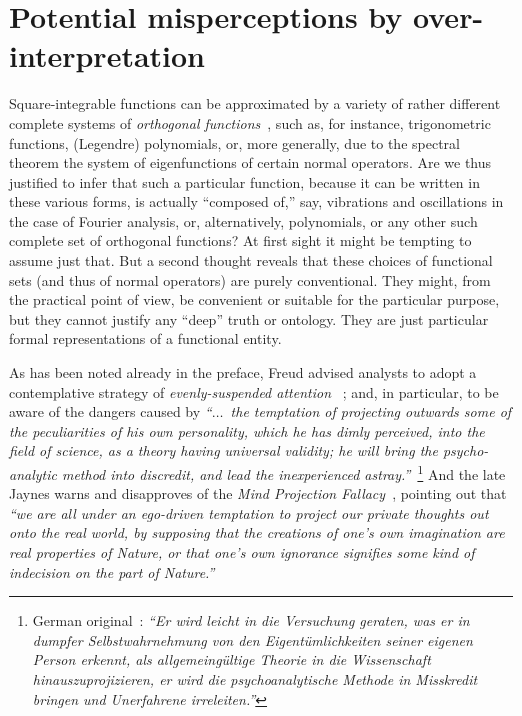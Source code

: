 \section{Potential misperceptions by over-interpretation}
\label{2016-pu-book-chapter-pu-pmboi}

Square-integrable functions can be approximated by a variety of rather different complete
systems of {\em orthogonal functions}~\cite[Section~10.4, p.~649]{arfken05},
such as, for instance, trigonometric functions, (Legendre) polynomials,
or, more generally, due to the spectral theorem
the system of eigenfunctions of certain normal operators.
Are we thus justified to infer that such a particular function, because it can be written in these various forms,
is actually ``composed of,'' say, vibrations and oscillations  in the case of Fourier analysis,
or, alternatively, polynomials, or any other such complete set of orthogonal functions?
At first sight it might be tempting to assume just that.
But a second thought reveals that these choices of functional sets (and thus of normal operators) are purely conventional.
They might, from the practical point of view, be convenient or suitable for the particular purpose,
but they cannot justify any ``deep'' truth or ontology.
They are just particular formal representations of a functional entity.



As has been noted already in the preface, Freud advised analysts
to adopt a contemplative strategy of {\em evenly-suspended attention}~\cite{Freud-1912,Freud-1912-e}
; and, in particular,  to be aware of the dangers
caused by {\em
``$\ldots$~the temptation of projecting outwards
some of the peculiarities of his own personality,
which he has dimly perceived, into the field of science,
as a theory having universal validity; he will bring the psycho-analytic method into discredit, and lead the inexperienced astray.''}~\cite{Freud-1912-e}\footnote{
German original~\cite{Freud-1912}: {\em ``Er wird leicht in die Versuchung geraten,
was er in dumpfer Selbstwahrnehmung von den Eigent\"umlichkeiten seiner eigenen Person erkennt,
als allgemeing\"ultige Theorie in die Wissenschaft hinauszuprojizieren,
er wird die psychoanalytische Methode in Misskredit bringen und Unerfahrene irreleiten.''}}
And the late Jaynes warns and disapproves of
the {\em Mind Projection Fallacy}~\cite{jaynes-89,jaynes-90},
pointing out that
{\em ``we are all under an ego-driven temptation to project our private
thoughts out onto the real world, by supposing that the creations of one's own imagination are real
properties of Nature, or that one's own ignorance signifies some kind of indecision on the part of
Nature.''}

